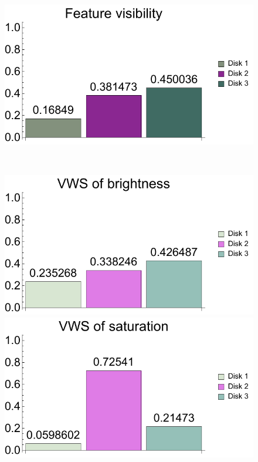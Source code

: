 \begin{figure}
	\centering
	\begin{minipage}{.45\textwidth}
		\includegraphics[width=1\linewidth]{figures/disk_visibility_chart_right}
		\subcaption{}
	\end{minipage}~
	\begin{minipage}{.45\textwidth}
		\includegraphics[width=1\linewidth]{figures/disk_visibility_saliency_brightness_chart_right}
		\subcaption{}
	\end{minipage}
	\begin{minipage}{.45\textwidth}
		\includegraphics[width=1\linewidth]{figures/disk_visibility_saliency_saturation_chart_right}

\end{minipage}
\end{figure}
